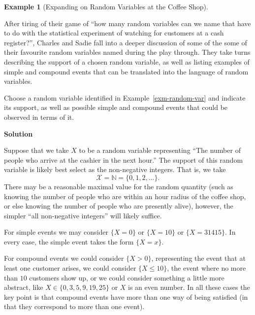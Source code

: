 \documentclass[
  letterpaper,
  DIV=11,
  numbers=noendperiod]{scrreprt}
\theoremstyle{definition}
\theoremstyle{definition}
\theoremstyle{definition}
\newtheorem{example}{Example}[chapter]
\theoremstyle{remark}
\begin{document}
\begin{example}[Expanding on Random Variables at the Coffee
Shop]\protect\hypertarget{exm-rv-recap}{}\label{exm-rv-recap}

After tiring of their game of ``how many random variables can we name
that have to do with the statistical experiment of watching for
customers at a cash register?'', Charles and Sadie fall into a deeper
discussion of some of the some of their favourite random variables named
during the play through. They take turns describing the support of a
chosen random variable, as well as listing examples of simple and
compound events that can be translated into the language of random
variables.

Choose a random variable identified in Example~\ref{exm-random-var} and
indicate its support, as well as possible simple and compound events
that could be observed in terms of it.

\begin{tcolorbox}[enhanced jigsaw, colback=white, breakable, rightrule=.15mm, leftrule=.75mm, toprule=.15mm, left=2mm, arc=.35mm, opacityback=0, bottomrule=.15mm]

\vspace{-3mm}\textbf{Solution}\vspace{3mm}

Suppose that we take \(X\) to be a random variable representing ``The
number of people who arrive at the cashier in the next hour.'' The
support of this random variable is likely best select as the
non-negative integers. That is, we take
\[\mathcal{X} = \mathbb{N} = \{0,1,2,\dots\}.\] There may be a
reasonable maximal value for the random quantity (such as knowing the
number of people who are within an hour radius of the coffee shop, or
else knowing the number of people who are presently alive), however, the
simpler ``all non-negative integers'' will likely suffice.

For simple events we may consider \(\{X = 0\}\) or \(\{X = 10\}\) or
\(\{X = 31415\}\). In every case, the simple event takes the form
\(\{X = x\}\).

For compound events we could consider \(\{X > 0\}\), representing the
event that at least one customer arises, we could consider
\(\{X \leq 10\}\), the event where no more than \(10\) customers show
up, or we could consider something a little more abstract, like
\(X \in \{0, 3, 5, 9, 19, 25\}\) or \(X\) is an even number. In all
these cases the key point is that compound events have more than one way
of being satisfied (in that they correspond to more than one event).

\end{tcolorbox}

\end{example}
\end{document}
